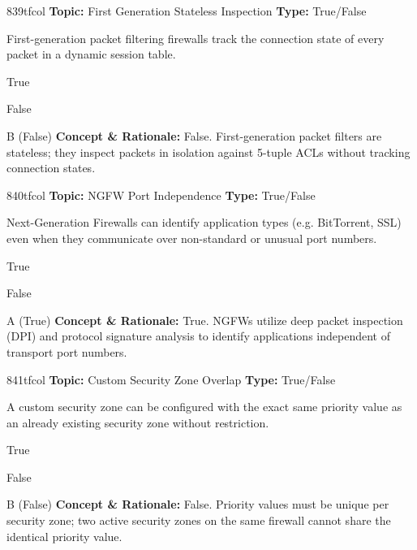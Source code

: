 \begin{qcard}{839}{tfcol}
\textcolor{darkslate!75}{\small\textbf{Topic:} First Generation Stateless Inspection \hfill \textbf{Type:} True/False}\vspace{0.4em}\par
First-generation packet filtering firewalls track the connection state of every packet in a dynamic session table.
\begin{qoptions}
\item True
\item False
\end{qoptions}
\end{qcard}
\nopagebreak
\begin{explainbox}{B (False)}
\textbf{Concept \& Rationale:} False. First-generation packet filters are stateless; they inspect packets in isolation against 5-tuple ACLs without tracking connection states.
\end{explainbox}

\begin{qcard}{840}{tfcol}
\textcolor{darkslate!75}{\small\textbf{Topic:} NGFW Port Independence \hfill \textbf{Type:} True/False}\vspace{0.4em}\par
Next-Generation Firewalls can identify application types (e.g. BitTorrent, SSL) even when they communicate over non-standard or unusual port numbers.
\begin{qoptions}
\item True
\item False
\end{qoptions}
\end{qcard}
\nopagebreak
\begin{explainbox}{A (True)}
\textbf{Concept \& Rationale:} True. NGFWs utilize deep packet inspection (DPI) and protocol signature analysis to identify applications independent of transport port numbers.
\end{explainbox}

\begin{qcard}{841}{tfcol}
\textcolor{darkslate!75}{\small\textbf{Topic:} Custom Security Zone Overlap \hfill \textbf{Type:} True/False}\vspace{0.4em}\par
A custom security zone can be configured with the exact same priority value as an already existing security zone without restriction.
\begin{qoptions}
\item True
\item False
\end{qoptions}
\end{qcard}
\nopagebreak
\begin{explainbox}{B (False)}
\textbf{Concept \& Rationale:} False. Priority values must be unique per security zone; two active security zones on the same firewall cannot share the identical priority value.
\end{explainbox}

